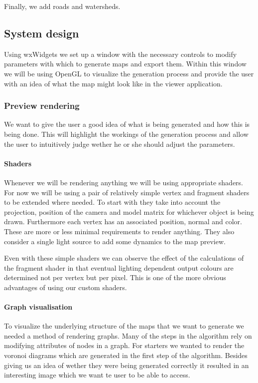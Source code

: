 Finally, we add roads and watersheds.

\subsection{System design}

Using wxWidgets we set up a window with the necessary controls to modify parameters with which to generate maps and export them. Within this window we will be using OpenGL to visualize the generation process and provide the user with an idea of what the map might look like in the viewer application.

\subsubsection{Preview rendering}

We want to give the user a good idea of what is being generated and how this is being done. This will highlight the workings of the generation process and allow the user to intuitively judge wether he or she should adjust the parameters.

\paragraph{Shaders}

Whenever we will be rendering anything we will be using appropriate shaders. For now we will be using a pair of relatively simple vertex and fragment shaders to be extended where needed. To start with they take into account the projection, position of the camera and model matrix for whichever object is being drawn. Furthermore each vertex has an associated position, normal and color. These are more or less minimal requirements to render anything. They also consider a single light source to add some dynamics to the map preview. 

Even with these simple shaders we can observe the effect of the calculations of the fragment shader in that eventual lighting dependent output colours are determined not per vertex but per pixel. This is one of the more obvious advantages of using our custom shaders.

\paragraph{Graph visualisation}

To visualize the underlying structure of the maps that we want to generate we needed a method of rendering graphs. Many of the steps in the algorithm rely on modifying attributes of nodes in a graph. For starters we wanted to render the voronoi diagrams which are generated in the first step of the algorithm. Besides giving us an idea of wether they were being generated correctly it resulted in an interesting image which we want te user to be able to access.

